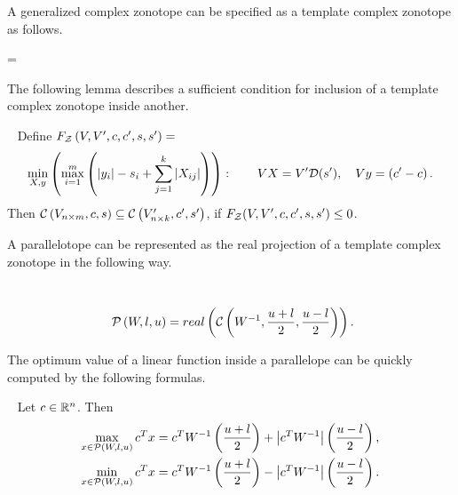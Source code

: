 


A generalized complex zonotope can be specified as a template complex zonotope as follows.
\begin{lemma}
 = 
\end{lemma}


The following lemma describes a sufficient condition for inclusion of
a template complex zonotope inside another.
\begin{lemma}~\label{lem:zon-zon} Define $F_{\mathcal{Z}}\left(V,V^\prime,c,c^\prime,s,s^\prime\right) = $
\begin{align}
\begin{split}
\min_{X,y}\left(\max_{i=1}^m\left(\left|y_i\right|-s_i+\sum_{j=1}^{k}\left|X_{ij}\right|\right)\right):~~~~~~VX
= V^\prime\mathcal{D}(s^\prime),~~~Vy = \left(c^\prime-c\right).\\
\end{split}
\end{align}
Then $\mathcal{C}\left(V_{n\times m},c,s\right)\subseteq \mathcal{C}\left(V_{n\times
    k}^\prime,c^\prime,s^\prime\right)$, if $F_{\mathcal{Z}}(V,V^\prime,c,c^\prime,s,s^\prime)\leq
0$.
\end{lemma}







A parallelotope can be represented as the real projection of a
template complex zonotope in the following way.
\begin{lemma}~\label{lem:ptope-zon}
\begin{equation}~\label{lem:ptope-zon}\mathcal{P}\left(W,l,u\right) = real\left(\mathcal{C}\left(W^{-1},\frac{u+l}{2},\frac{u-l}{2}\right) \right).\end{equation}
\end{lemma}

The optimum value of a linear function inside a parallelope can be quickly
computed by the following formulas.
\begin{lemma}~\label{lem:opt-ptope}
Let $c\in\mathbb{R}^n$. Then
\begin{align}
\max_{x\in\mathcal{P}\left(W,l,u\right)}c^Tx = c^TW^{-1}\left(\frac{u+l}{2}\right) + \left|c^TW^{-1}\right|\left(\frac{u-l}{2}\right),\\
\min_{x\in\mathcal{P}\left(W,l,u\right)}c^Tx = c^TW^{-1}\left(\frac{u+l}{2}\right) - \left|c^TW^{-1}\right|\left(\frac{u-l}{2}\right).
\end{align}
\end{lemma}

